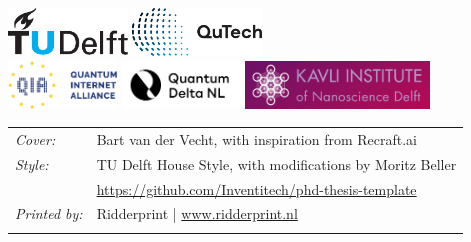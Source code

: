 \begin{titlepage}

\vfill

\begin{center}
\noindent
\includegraphics[height=0.5in]{figures/logos/tudelft.pdf}
\hfill
\includegraphics[height=0.5in]{figures/logos/qutech.pdf}
\hfill
\\ \vspace{2\baselineskip}
\includegraphics[height=0.5in]{figures/logos/qia.pdf}
\hfill
\includegraphics[height=0.5in]{figures/logos/qdnl.png}
\hfill
\includegraphics[height=0.5in]{figures/logos/kavli.pdf}
\end{center}

\vfill

\noindent
\begin{tabular}{@{}p{}@{}p{}}
    \textit{Cover:} & Bart van der Vecht, with inspiration from Recraft.ai \\[\medskipamount]
    \textit{Style:} & TU Delft House Style, with modifications by Moritz Beller \\
    & \url{https://github.com/Inventitech/phd-thesis-template} \\[\medskipamount]
    \textit{Printed by:} & Ridderprint | \url{www.ridderprint.nl}\\
    & \\[\medskipamount]
\end{tabular}


\end{titlepage}
